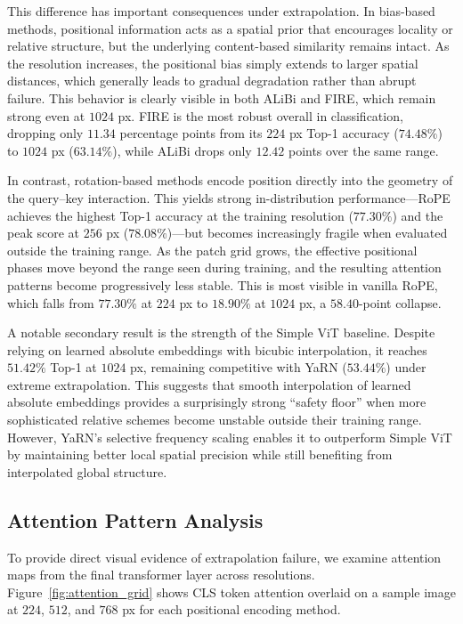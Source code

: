 This difference has important consequences under extrapolation. In bias-based methods, positional
information acts as a spatial prior that encourages locality or relative structure, but the
underlying content-based similarity remains intact. As the resolution increases, the positional
bias simply extends to larger spatial distances, which generally leads to gradual degradation
rather than abrupt failure. This behavior is clearly visible in both ALiBi and FIRE, which remain
strong even at $1024$ px. FIRE is the most robust overall in classification, dropping only
$11.34$ percentage points from its $224$ px Top-1 accuracy ($74.48\%$) to $1024$ px
($63.14\%$), while ALiBi drops only $12.42$ points over the same range.

In contrast, rotation-based methods encode position directly into the geometry of the query--key
interaction. This yields strong in-distribution performance---RoPE achieves the highest Top-1
accuracy at the training resolution ($77.30\%$) and the peak score at $256$ px ($78.08\%$)---but
becomes increasingly fragile when evaluated outside the training range. As the patch grid grows,
the effective positional phases move beyond the range seen during training, and the resulting
attention patterns become progressively less stable. This is most visible in vanilla RoPE, which
falls from $77.30\%$ at $224$ px to $18.90\%$ at $1024$ px, a $58.40$-point collapse.

A notable secondary result is the strength of the Simple ViT baseline. Despite relying on learned
absolute embeddings with bicubic interpolation, it reaches $51.42\%$ Top-1 at $1024$ px,
remaining competitive with YaRN ($53.44\%$) under extreme extrapolation. This
suggests that smooth interpolation of learned absolute embeddings provides a surprisingly strong
``safety floor'' when more sophisticated relative schemes become unstable outside their training
range. However, YaRN's selective frequency scaling enables it to outperform Simple ViT by
maintaining better local spatial precision while still benefiting from interpolated global structure.

\subsection{Attention Pattern Analysis}

To provide direct visual evidence of extrapolation failure, we examine attention maps from the final
transformer layer across resolutions. Figure~\ref{fig:attention_grid} shows CLS token attention
overlaid on a sample image at $224$, $512$, and $768$ px for each positional encoding method.

